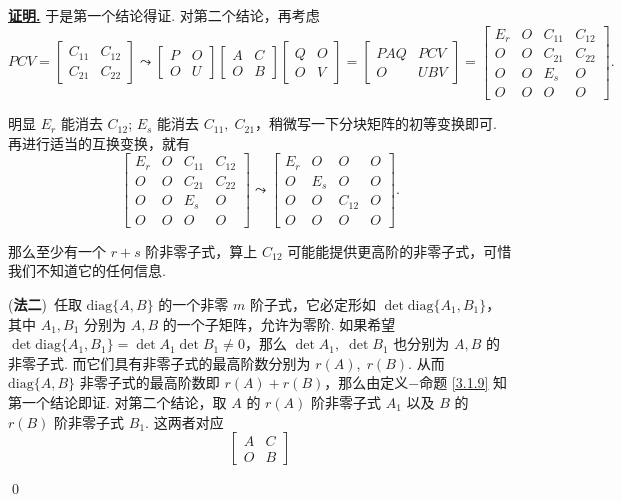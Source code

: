 \documentclass[10pt,openany]{article}
\theoremstyle{thmstyle} %
\theoremstyle{defstyle} %
\theoremstyle{prostyle} %
\theoremstyle{exastyle}
\theoremstyle{remstyle}
\renewenvironment{proof}[1][证明]{\par\underline{\textbf{#1.}} \;\fangsong}{\qed\par}
\newcommand{\diag}{\mathrm{diag}}
\begin{document}
\begin{proof}
于是第一个结论得证. 对第二个结论，再考虑 
\[ PCV=\begin{bmatrix}
	C_{11} & C_{12} \\
	C_{21} & C_{22}
\end{bmatrix} \leadsto \begin{bmatrix}
P & O \\ O & U
\end{bmatrix}\begin{bmatrix}
A & C \\ O & B
\end{bmatrix}\begin{bmatrix}
Q & O \\ O & V
\end{bmatrix}=\begin{bmatrix}
PAQ & PCV \\ O & UBV
\end{bmatrix}=\begin{bmatrix}
E_r & O & C_{11} & C_{12} \\ O & O & C_{21} & C_{22} \\ O & O & E_s & O \\ O & O & O & O 
\end{bmatrix}. \]

明显 \( E_r \) 能消去 \( C_{12} \); \( E_s \) 能消去 \( C_{11}, \; C_{21} \)，稍微写一下分块矩阵的初等变换即可. 再进行适当的互换变换，就有
\[ \begin{bmatrix}
	E_r & O & C_{11} & C_{12} \\ O & O & C_{21} & C_{22} \\ O & O & E_s & O \\ O & O & O & O 
\end{bmatrix} \leadsto \begin{bmatrix}
E_r & O & O & O \\ O & E_s & O & O \\ O & O & C_{12} & O \\ O & O & O & O 
\end{bmatrix}. \]

那么至少有一个 \( r+s \) 阶非零子式，算上 \( C_{12} \) 可能能提供更高阶的非零子式，可惜我们不知道它的任何信息.

(\textbf{法二})\ 任取 \( \diag\{A,B\} \) 的一个非零 \( m \) 阶子式，它必定形如 \( \det \diag\{A_1,B_1\} \)，其中 \( A_1,B_1 \) 分别为 \( A,B \) 的一个子矩阵，允许为零阶. 如果希望 \( \det \diag\{A_1,B_1\}=\det A_1 \det B_1 \neq 0 \)，那么 \( \det A_1, \; \det B_1 \) 也分别为 \( A, B \) 的非零子式. 而它们具有非零子式的最高阶数分别为 \( r(A), \; r(B) \). 从而 \( \diag\{A,B\} \) 非零子式的最高阶数即 \( r(A)+r(B) \)，那么由定义\(-\)命题 \ref{3.1.9} 知第一个结论即证. 对第二个结论，取 \( A \) 的 \( r(A) \) 阶非零子式 \( A_1 \) 以及 \( B \) 的 \( r(B) \) 阶非零子式 \( B_1 \). 这两者对应
\[ \begin{bmatrix}
	A & C \\ O & B
\end{bmatrix} \]


\end{proof}
\end{document}
